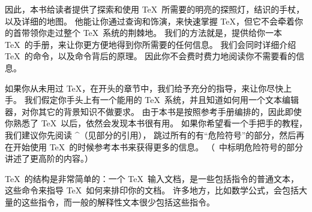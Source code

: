 因此，本书给读者提供了探索和使用 \TeX\ 所需要的明亮的探照灯，结识的手杖，以及详细的地图。
他能让你通过查询和饰演，来快速掌握 \TeX ，但它不会牵着你的首带领你走过整个 \TeX\ 系统的荆棘地。
我们的方法就是，提供给你一本 \TeX\ 的手册，来让你更方便地得到你所需要的任何信息。
我们会同时详细介绍 \TeX\ 的命令，以及命令背后的原理。
因此你不会费时费力地阅读你不需要看的信息。

如果你从未用过 \TeX ，在开头的章节中，我们给予充分的指导，来让你尽快上手。
我们假定你手头上有一个能用的 \TeX\ 系统，并且知道如何用一个文本编辑器，对你其它的背景知识不做要求。
由于本书是按照参考手册编排的，因此即使你熟悉了 \TeX\ 以后，依然会发现本书很有用。
如果你希望看一个手把手的教程，我们建议你先阅读 ^{\texbook}（见部分的引用），
跳过所有的有“危险符号”的部分，然后再在开始使用 \TeX\ 的时候参考本书来获得更多的信息。%
（\texbook\ 中标明危险符号的部分讲述了更高阶的内容。）

\TeX\ 的结构是非常简单的：一个 \TeX\ 输入文档，是一些包括指令的普通文本，
这些命令来指导 \TeX\ 如何来排印你的文档。
许多地方，比如数学公式，会包括大量的这些指令，而一般的解释性文本很少包括这些指令。

